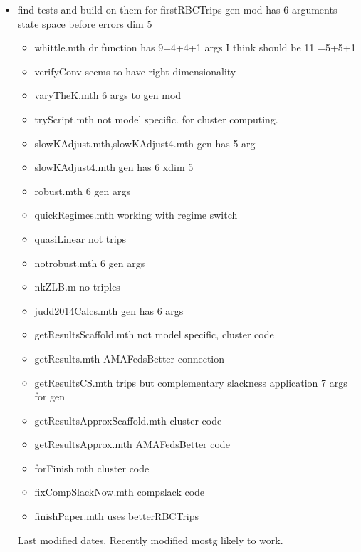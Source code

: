 \documentclass[hyperref]{labbook}
\begin{document}
\begin{itemize}
\item find tests and build on them for firstRBCTrips  gen mod has 6 arguments state space  before errors dim 5
  \begin{itemize}
  \item whittle.mth dr function has 9=4+4+1 args  I think should be 11 =5+5+1
  \item verifyConv seems to have right dimensionality 
  \item varyTheK.mth 6 args to gen mod
  \item tryScript.mth not model specific. for cluster computing.
  \item slowKAdjust.mth,slowKAdjust4.mth gen has 5 arg 
  \item slowKAdjust4.mth gen has 6 xdim 5
  \item robust.mth  6 gen args 
  \item quickRegimes.mth working with regime switch
  \item quasiLinear not trips
  \item notrobust.mth  6 gen args 
  \item nkZLB.m no triples
  \item judd2014Calcs.mth  gen has 6 args
  \item getResultsScaffold.mth not model specific, cluster code
  \item getResults.mth AMAFedsBetter connection
  \item getResultsCS.mth  trips but complementary slackness application  7 args for gen
  \item getResultsApproxScaffold.mth cluster code
  \item getResultsApprox.mth AMAFedsBetter code
  \item forFinish.mth  cluster code
  \item fixCompSlackNow.mth  compslack code
  \item finishPaper.mth uses betterRBCTrips
  \end{itemize}
Last modified dates.  Recently modified mostg likely to work.


\end{itemize}
\end{document}
